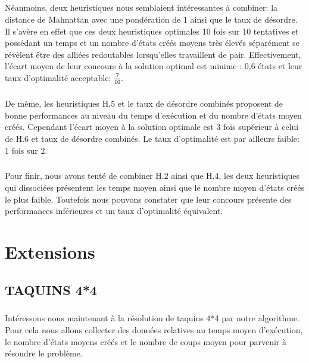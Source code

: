 \documentclass[10pt,a4paper]{report}
\begin{document}
\paragraph{}{Néanmoins, deux heuristiques nous semblaient intéressantes à combiner: la distance de Mahnattan avec une pondération de 1 ainsi que le taux de désordre. Il s'avère en effet que ces deux heuristiques optimales 10 fois sur 10 tentatives et possédant un temps et un nombre d'états créés moyens très élevés séparément se révèlent être des alliées redoutables lorsqu'elles travaillent de pair. Effectivement, l'écart moyen de leur concours à la solution optimal est minime : 0,6 états et leur taux d'optimalité acceptable: $\mathsf{\tfrac{7}{10}}$.}

\paragraph{}{De même, les heuristiques H.5 et le taux de désordre combinés proposent de bonne performances au niveau du temps d'exécution et du nombre d'états moyen créés. Cependant l'écart moyen à la solution optimale est 3 fois supérieur à celui de H.6 et taux de désordre combinés. Le taux d'optimalité est par ailleurs faible: 1 fois sur 2.}

\paragraph{}{Pour finir, nous avons tenté de combiner H.2 ainsi que H.4, les deux heuristiques qui dissociées présentent les temps moyen ainsi que le nombre moyen d'états créés le plus faible. Toutefois nous pouvons constater que leur concours présente des performances inférieures et un taux d'optimalité équivalent.}
\chapter{Extensions}
\section{TAQUINS 4*4}
\paragraph{}{Intéressons nous maintenant à la résolution de taquins 4*4 par notre algorithme. Pour cela nous allons collecter des données relatives au temps moyen d'exécution, le nombre d'états moyens créés et le nombre de coups moyen pour parvenir à résoudre le problème.}
\end{document}
